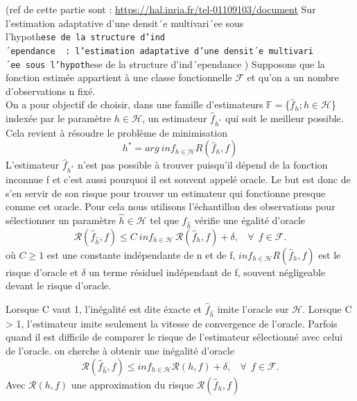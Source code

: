 \documentclass[
]{book}
\theoremstyle{definition}
\theoremstyle{definition}
\theoremstyle{definition}
\theoremstyle{definition}
\theoremstyle{remark}
\begin{document}
(ref de cette partie sont : \url{https://hal.inria.fr/tel-01109103/document} \newline
Sur l'estimation adaptative d'une densit´e
multivari´ee sous l'hypoth\texttt{ese\ de\ la\ structure\ d’ind´ependance\ \ :\ l’estimation\ adaptative\ d’une\ densit´e\ multivari´ee\ sous\ l’hypoth}ese de la structure
d'ind´ependance
)\newline
Supposons que la fonction estimée appartient à une classe fonctionnelle \(\mathcal{F}\) et qu'on a un nombre d'observations n fixé.\\
On a pour objectif de choisir, dans une famille d'estimateurs \(\mathbb{F} =\)\{\(\hat{f}_h ; h\in \mathcal{H}\)\} indexée par le paramètre \(h \in \mathcal{H}\), un estimateur \(\hat{f}_{h^*}\) qui soit le meilleur possible.\\
Cela revient à résoudre le problème de minimisation
\[
h^*=arg~inf_{h \in \mathcal{H}} R(\hat{f}_h,f)
\]
L'estimateur \(\hat{f}_{h^*}\) n'est pas possible à trouver puisqu'il dépend de la fonction inconnue f et c'est aussi pourquoi il est souvent appelé oracle. Le but est donc de s'en servir de son risque pour trouver un estimateur qui fonctionne presque comme cet oracle. Pour cela nous utilisons l'échantillon des observations pour sélectionner un paramètre \(\hat{h} \in \mathcal{H}\) tel que \(\hat{f}_{\hat{h}}\) vérifie une égalité d'oracle
\[
\mathcal{R}(\hat{f}_{\hat{h}},f) \leq C~inf_{h\in \mathcal{H}}~\mathcal{R}(\hat{f}_{h},f)+\delta,~~~~\forall~~f \in \mathcal{F}.
\]
où \(C \geq 1\) est une constante indépendante de n et de f, \(inf_{h\in \mathcal{H}}R(\hat{f}_h,f)\) est le risque d'oracle et \(\delta\) un terme résiduel indépendant de f, souvent négligeable devant le risque d'oracle.\\

\begin{rem}
Lorsque C vaut 1, l'inégalité est dite éxacte et $\hat{f}_{\hat{h}}$ imite l'oracle sur $\mathcal{H}$. \newline
Lorsque C > 1, l'estimateur imite seulement la vitesse de convergence de l'oracle.\newline
Parfois quand il est difficile de comparer le risque de l'estimateur sélectionné avec celui de l'oracle. on cherche à obtenir une inégalité d'oracle
$$
\mathcal{R}(\hat{f}_{\hat{h}},f) \leq inf_{h \in \mathcal{H}}\mathcal{R}(h,f)+\delta,~~~~\forall~~f \in \mathcal{F}.
$$
 Avec $\mathcal{R}(h,f)$ une approximation du risque $\mathcal{R}(\hat{f}_{h},f)$ 
\end{rem}
\end{document}
